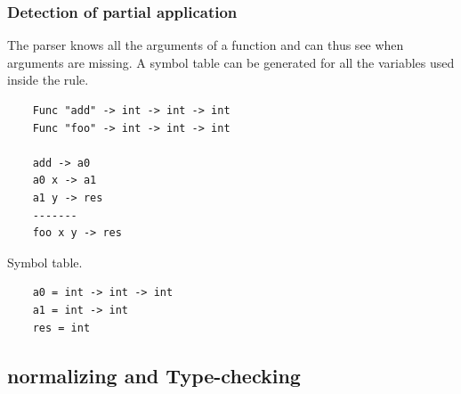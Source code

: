\begin{frame}[fragile]
    \frametitle{Detection of partial application}   
    The parser knows all the arguments of a function and can thus see when arguments are missing.
    A symbol table can be generated for all the variables used inside the rule.

    \begin{lstlisting}
    Func "add" -> int -> int -> int
    Func "foo" -> int -> int -> int
    
    add -> a0
    a0 x -> a1
    a1 y -> res
    -------
    foo x y -> res
    \end{lstlisting}

    Symbol table.
    \begin{lstlisting}
    a0 = int -> int -> int
    a1 = int -> int
    res = int
    \end{lstlisting}
\end{frame}

\subsection{normalizing and Type-checking}

\frame{
    \frametitle{}
}
